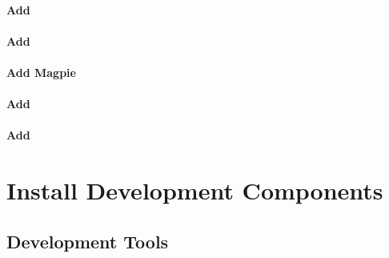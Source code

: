 \documentclass[letterpaper]{article}
\begin{document}
\vspace*{0.4cm}

\paragraph{Add \clustershell{}}


\paragraph{Add \genders{}}


\paragraph{Add Magpie}


\paragraph{Add \conman{}} \label{sec:add_conman}


\paragraph{Add \nhc{}} \label{sec:add_nhc}



%
%


\section{Install \OHPC{} Development Components}


\subsection{Development Tools} \label{sec:install_dev_tools}

\end{document}
